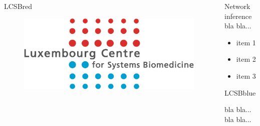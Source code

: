 \documentclass[final]{beamer}
\newlength{\sepwid}
\newlength{\twocolwid}
\newcommand{\bluebullet}{\raisebox{1.5mm}{$\bullet$}\hspace{0.3cm}}
\begin{document}
\begin{frame}[t]
\begin{columns}[t]
\begin{column}{\twocolwid}
\begin{myblock}{LCSBred}
        \begin{figure}[htb]   %
          \centering
          \includegraphics[width=.8\textwidth]{logo/LCSB-logo-long}
        \end{figure}
        \vspace*{.5cm}
      \end{myblock}

    \end{column}%



    \begin{column}{\twocolwid}
      \vspace{1.55cm}

      \begin{block}{\textsf{Network inference}}
        \large
        bla bla...

        \begin{itemize}
        \item[\bluebullet] item 1
        \item[\bluebullet] item 2
        \item[\bluebullet] item 3
        \end{itemize}

        \vspace*{2.7cm}
        \begin{myblock}{LCSBblue}
          \vspace*{.3cm}
          \begin{minipage}[t]{.95\textwidth}
            \begin{algorithmic}[1]
              \State bla bla...
              \State bla bla...
            \end{algorithmic}
          \end{minipage}
          \vspace*{.3cm}
        \end{myblock}


\end{block}
\end{column}
\end{columns}
\end{frame}
\end{document}
